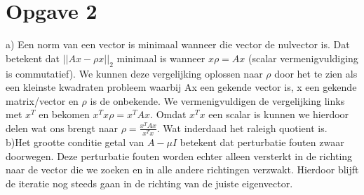\documentclass[]{article}
\newcommand{\opgave}[1]{\section*{Opgave #1}}
\begin{document}
\opgave2
a) Een norm van een vector is minimaal wanneer die vector de nulvector is.
Dat betekent dat $||Ax-\rho x||_{2}$ minimaal is wanneer $x \rho = Ax$ (scalar vermenigvuldiging is commutatief). We kunnen deze vergelijking oplossen naar $\rho$ door het te zien als een kleinste kwadraten probleem waarbij Ax een gekende vector is, x een gekende matrix/vector en $\rho$ is de onbekende. We vermenigvuldigen de vergelijking links met $x^T$ en bekomen $x^{T}x \rho = x^{T}Ax$. Omdat $x^{T}x$ een scalar is kunnen we hierdoor delen wat ons brengt naar $\rho = \frac{ x^{T}Ax}{x^{T}x}$. Wat inderdaad het raleigh quotient is.\\


b)Het grootte conditie getal van $A-\mu I$ betekent dat perturbatie fouten zwaar doorwegen. Deze perturbatie fouten worden echter alleen versterkt in de richting naar de vector die we zoeken en in alle andere richtingen verzwakt. Hierdoor blijft de iteratie nog steeds gaan in de richting van de juiste eigenvector.
\end{document}
